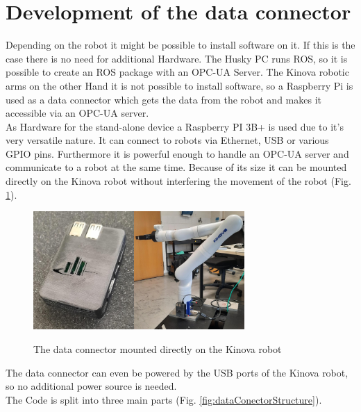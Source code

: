 \documentclass[conference]{IEEEtran}
\begin{document}
\section{Development of the data connector}
Depending on the robot it might be possible to install software on it.
If this is the case there is no need for additional Hardware.
The Husky PC runs ROS, so it is possible to create an ROS package with an OPC-UA Server.
The Kinova robotic arms on the other Hand it is not possible to install software, so a Raspberry Pi is used as a data connector which gets the data from the robot and makes it accessible via an OPC-UA server.\\
As Hardware for the stand-alone device a Raspberry PI 3B+ is used due to it's very versatile nature. It can connect to robots via Ethernet, USB or various GPIO pins.
Furthermore it is powerful enough to handle an OPC-UA server and communicate to a robot at the same time.
Because of its size it can be mounted directly on the Kinova robot without interfering the movement of the robot (Fig. \ref{fig:dataConectorPic}).
\begin{figure}[htbp]
    \centerline{\includegraphics[height=4.5cm]{Pictures/PiGehaeuseVorne.jpeg}\hspace{0.1cm}\includegraphics[height=4.5cm]{Pictures/PiAmKinova.jpeg}}
    \caption{The data connector mounted directly on the Kinova robot}
    \label{fig:dataConectorPic}
\end{figure}
The data connector can even be powered by the USB ports of the Kinova robot, so no additional power source is needed.\\
The Code is split into three main parts (Fig. \ref{fig:dataConectorStructure}).
\end{document}
